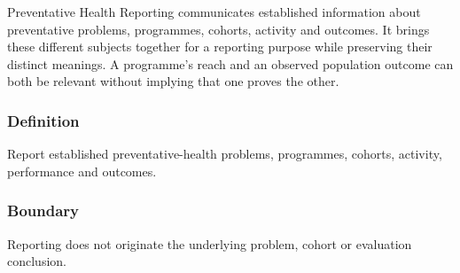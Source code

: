 Preventative Health Reporting communicates established information about preventative problems, programmes, cohorts, activity and outcomes. It brings these different subjects together for a reporting purpose while preserving their distinct meanings. A programme's reach and an observed population outcome can both be relevant without implying that one proves the other.

\subsubsection*{Definition}

Report established preventative-health problems, programmes, cohorts, activity, performance and outcomes.

\subsubsection*{Boundary}

Reporting does not originate the underlying problem, cohort or evaluation conclusion.

